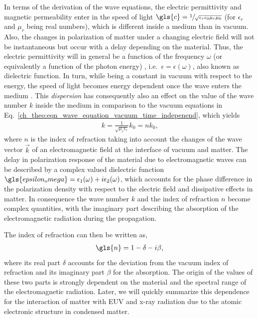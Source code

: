 In terms of the derivation of the wave equations, the electric permittivity and magnetic permeability enter in the speed of light $\gls{c} = \sfrac{1}{\sqrt{\epsilon_r \epsilon_0 \mu_r \mu_0}}$ (for $\epsilon_r$ and $\mu_r$ being real numbers), which is different inside a medium than in vacuum. Also, the changes in polarization of matter under a changing electric field will not be instantaneous but occur with a delay depending on the material. Thus, the electric permittivity will in general be a function of the frequency $\omega$ (or equivalently a function of the photon energy) , i.e.~$\epsilon = \epsilon(\omega)$, also known as dielectric function. In turn, while being a constant in vacuum with respect to the energy, the speed of light becomes energy dependent once the wave enters the medium \cite{bergevin_interaction_2009}. This \emph{dispersion} has consequently also an effect on the value of the wave number $k$ inside the medium in comparison to the vacuum equations in Eq.~\eqref{ch_theo:eqn_wave_equation_vacuum_time_indepenend}, which yields
\begin{align}
 k = \frac{1}{\sqrt{\mu_r \epsilon_r}} k_0 = n k_0\text{,} \label{ch_theo:eqn_k_inside_medium}
\end{align}
where $n$ is the index of refraction taking into account the changes of the wave vector $\vec{k}$ of an electromagnetic field at the interface of vacuum and matter. The delay in polarization response of the material due to electromagnetic waves can be described by a complex valued dielectric function $\gls{epsilon_omega} = \epsilon_1(\omega) + i \epsilon_2(\omega)$, which accounts for the phase difference in the polarization density with respect to the electric field and dissipative effects in matter. In consequence the wave number $k$ and the index of refraction $n$ become complex quantities, with the imaginary part describing the absorption of the electromagnetic radiation during the propagation.

The index of refraction can then be written as,
\begin{align}
\gls{n} = 1 - \delta - i \beta \text{,} \label{ch_theo:eqn_n}
\end{align}
where its real part $\delta$ accounts for the deviation from the vacuum index of refraction and its imaginary part $\beta$ for the absorption. The origin of the values of these two parts is strongly dependent on the material and the spectral range of the electromagnetic radiation. Later, we will quickly summarize this dependence for the interaction of matter with EUV and x-ray radiation due to the atomic electronic structure in condensed matter.

